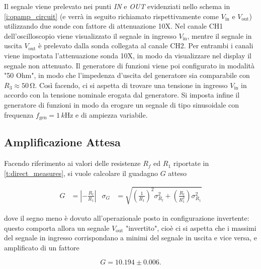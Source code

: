 \documentclass[a4paper,11pt]{article} %
\begin{document}
\noindent Il segnale viene prelevato nei punti \textit{IN} e \textit{OUT} evidenziati nello schema in 
\autoref{i:opamp_circuit} (e verrà in seguito richiamato rispettivamente come $V_{\text{in}}$ e $V_{\text{out}}$)
utilizzando due sonde con fattore di attenuazione 10X. Nel canale CH1 dell'oscilloscopio viene visualizzato il segnale
in ingresso $V_{\text{in}}$, mentre il segnale in uscita $V_{\text{out}}$ è prelevato dalla sonda collegata al canale
CH2. Per entrambi i canali viene impostata l'attenuazione sonda 10X, in modo da visualizzare nel display il segnale non
attenuato. Il generatore di funzioni viene poi configurato in modalità "50 Ohm", in modo che l'impedenza d'uscita del
generatore sia comparabile con $R_3\approx 50\,\si{\ohm}$. Così facendo, ci si aspetta di trovare una tensione in ingresso
$V_{\text{in}}$ in accordo con la tensione nominale erogata dal generatore. Si imposta infine il generatore di funzioni
in modo da erogare un segnale di tipo sinusoidale con frequenza $f_{\text{gen}}=1\,\si{k\hertz}$ e di ampiezza
variabile.


\subsection{Amplificazione Attesa}\label{s:guadagno}
Facendo riferimento ai valori delle resistenze  $R_f$ ed $R_1$ riportate in  \autoref{t:direct_measures}, si vuole
calcolare il guadagno $G$ atteso

\begin{align}\label{e:guadagno}
	G&=\left|-\frac{R_{\text{f}}}{R_{1}}\right| 
	&
	\sigma_{G}&=\sqrt{	\left(	\frac{	1	}{	R_{1}	}	\right)^2	\sigma_{R_{\text{f}}}^2	
	+	\left(	\frac{	R_{\text{f}}	}{	R_{1}^2	}	\right)\sigma_{R_{1}}^2	}	
\end{align}

\noindent dove il segno meno è dovuto all'operazionale posto in configurazione invertente: questo comporta allora un
segnale  $V_{\text{out}}$ "invertito", cioè ci si aspetta che i massimi del segnale in ingresso corrispondano a minimi
del segnale in uscita e vice versa, e amplificato di un fattore 

\begin{equation}
	G = 10.194 \pm 0.006.
\end{equation}
\end{document}
